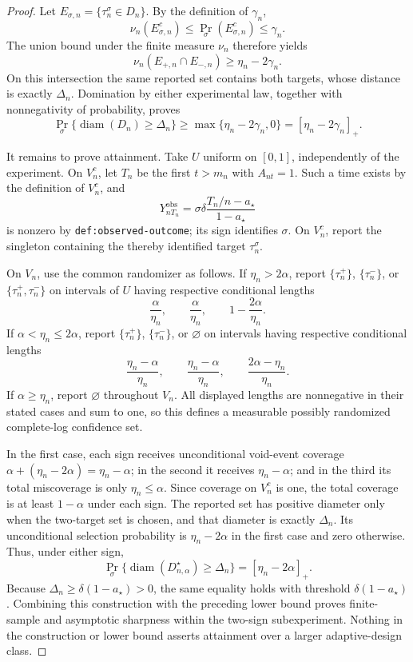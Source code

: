 \documentclass{article}
\begin{document}
\begin{proof}
Let \(E_{\sigma,n}=\{\tau_n^\sigma\in D_n\}\). By the definition of \(\gamma_n\),
\[
 \nu_n(E_{\sigma,n}^c)
 \le\Pr_\sigma(E_{\sigma,n}^c)
 \le\gamma_n.
\]
The union bound under the finite measure \(\nu_n\) therefore yields
\[
 \nu_n(E_{+,n}\cap E_{-,n})
 \ge\eta_n-2\gamma_n.
\]
On this intersection the same reported set contains both targets, whose distance is exactly \(\Delta_n\). Domination by either experimental law, together with nonnegativity of probability, proves
\[
 \Pr_\sigma\{\operatorname{diam}(D_n)\ge\Delta_n\}
 \ge\max\{\eta_n-2\gamma_n,0\}
 =[\eta_n-2\gamma_n]_+.
\]

It remains to prove attainment. Take \(U\) uniform on \([0,1]\), independently of the experiment. On \(V_n^c\), let \(T_n\) be the first \(t>m_n\) with \(A_{nt}=1\). Such a time exists by the definition of \(V_n^c\), and
\[
 Y_{nT_n}^{\mathrm{obs}}
 =\sigma\delta\frac{T_n/n-a_\star}{1-a_\star}
\]
is nonzero by \texttt{def:observed-outcome}; its sign identifies \(\sigma\). On \(V_n^c\), report the singleton containing the thereby identified target \(\tau_n^\sigma\).

On \(V_n\), use the common randomizer as follows. If \(\eta_n>2\alpha\), report \(\{\tau_n^+\}\), \(\{\tau_n^-\}\), or \(\{\tau_n^+,\tau_n^-\}\) on intervals of \(U\) having respective conditional lengths
\[
 \frac\alpha{\eta_n},\qquad
 \frac\alpha{\eta_n},\qquad
 1-\frac{2\alpha}{\eta_n}.
\]
If \(\alpha<\eta_n\le2\alpha\), report \(\{\tau_n^+\}\), \(\{\tau_n^-\}\), or \(\varnothing\) on intervals having respective conditional lengths
\[
 \frac{\eta_n-\alpha}{\eta_n},\qquad
 \frac{\eta_n-\alpha}{\eta_n},\qquad
 \frac{2\alpha-\eta_n}{\eta_n}.
\]
If \(\alpha\ge\eta_n\), report \(\varnothing\) throughout \(V_n\). All displayed lengths are nonnegative in their stated cases and sum to one, so this defines a measurable possibly randomized complete-log confidence set.

In the first case, each sign receives unconditional void-event coverage
\(\alpha+(\eta_n-2\alpha)=\eta_n-\alpha\); in the second it receives \(\eta_n-\alpha\); and in the third its total miscoverage is only \(\eta_n\le\alpha\). Since coverage on \(V_n^c\) is one, the total coverage is at least \(1-\alpha\) under each sign. The reported set has positive diameter only when the two-target set is chosen, and that diameter is exactly \(\Delta_n\). Its unconditional selection probability is \(\eta_n-2\alpha\) in the first case and zero otherwise. Thus, under either sign,
\[
 \Pr_\sigma\{\operatorname{diam}(D_{n,\alpha}^\star)\ge\Delta_n\}
 =[\eta_n-2\alpha]_+.
\]
Because \(\Delta_n\ge\delta(1-a_\star)>0\), the same equality holds with threshold \(\delta(1-a_\star)\). Combining this construction with the preceding lower bound proves finite-sample and asymptotic sharpness within the two-sign subexperiment. Nothing in the construction or lower bound asserts attainment over a larger adaptive-design class.
\end{proof}
\end{document}
